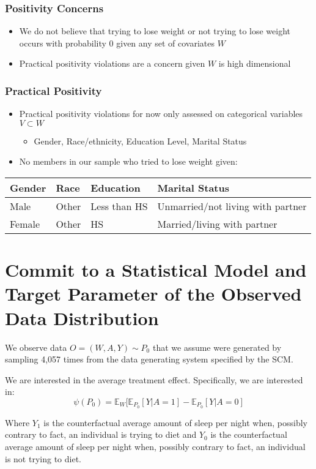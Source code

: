 \documentclass{article}
\begin{document}
\begin{frame}
\frametitle{Positivity Concerns}
\begin{itemize}
 \item We do not believe that trying to lose weight or not trying to lose weight occurs with probability $0$ given any set of  covariates $W$
 \item Practical positivity violations are a concern given $W$ is high dimensional
\end{itemize}
\end{frame}

\begin{frame}
\frametitle{Practical Positivity}
\begin{itemize}
 \item Practical positivity violations for now only assessed on categorical variables $V\subset W$
 \begin{itemize}
  \item Gender, Race/ethnicity, Education Level, Marital Status
 \end{itemize}
 \item No members in our sample who tried to lose weight given:
\end{itemize}
\begin{tabular}{| l | l | l | l |}
\hline
 Gender & Race & Education & Marital Status \\
\hline
Male & Other & Less than HS & Unmarried/not living with partner \\
Female & Other & HS & Married/living with partner \\
\hline
\end{tabular}
\end{frame}


\section{Commit to a Statistical Model and Target Parameter of the Observed Data Distribution}

We observe data $O = (W, A, Y) \sim P_0$ that we assume were generated by sampling 4,057 times from the data generating system specified by the SCM.

We are interested in the average treatment effect. Specifically, we are interested in:
$$\psi(P_{0}) =\mathbb{E}_W[\mathbb{E}_{P_{0}}[Y|A=1] - \mathbb{E}_{P_{0}}[Y|A=0] $$

Where $Y_1$ is the counterfactual average amount of sleep per night when, possibly contrary to fact, an individual is trying to diet and $Y_0$ is the counterfactual average amount of sleep per night when, possibly contrary to fact, an individual is not trying to diet.
\end{document}
